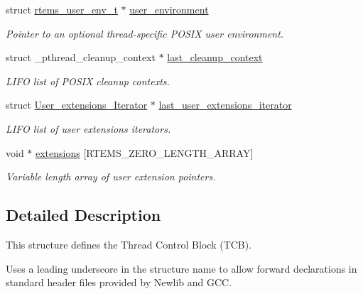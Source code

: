 \begin{DoxyCompactItemize}
struct \mbox{\hyperlink{structrtems__user__env__t}{rtems\+\_\+user\+\_\+env\+\_\+t}} $\ast$ \mbox{\hyperlink{struct__Thread__Control_ae713ecc17e088572e42afdbe076c8149}{user\+\_\+environment}}
\begin{DoxyCompactList}\small\item\em Pointer to an optional thread-\/specific P\+O\+S\+IX user environment. \end{DoxyCompactList}\item 
\mbox{\label{struct__Thread__Control_abce65bc1501abd0a846097b5af9e0604}} 
struct \+\_\+pthread\+\_\+cleanup\+\_\+context $\ast$ \mbox{\hyperlink{struct__Thread__Control_abce65bc1501abd0a846097b5af9e0604}{last\+\_\+cleanup\+\_\+context}}
\begin{DoxyCompactList}\small\item\em L\+I\+FO list of P\+O\+S\+IX cleanup contexts. \end{DoxyCompactList}\item 
\mbox{\label{struct__Thread__Control_a18a1b23d5aaaa58ccbba691990b64feb}} 
struct \mbox{\hyperlink{structUser__extensions__Iterator}{User\+\_\+extensions\+\_\+\+Iterator}} $\ast$ \mbox{\hyperlink{struct__Thread__Control_a18a1b23d5aaaa58ccbba691990b64feb}{last\+\_\+user\+\_\+extensions\+\_\+iterator}}
\begin{DoxyCompactList}\small\item\em L\+I\+FO list of user extensions iterators. \end{DoxyCompactList}\item 
void $\ast$ \mbox{\hyperlink{struct__Thread__Control_ada69103bd5a31290709bde9d9c5aeff8}{extensions}} \mbox{[}R\+T\+E\+M\+S\+\_\+\+Z\+E\+R\+O\+\_\+\+L\+E\+N\+G\+T\+H\+\_\+\+A\+R\+R\+AY\mbox{]}
\begin{DoxyCompactList}\small\item\em Variable length array of user extension pointers. \end{DoxyCompactList}\end{DoxyCompactItemize}


\subsection{Detailed Description}
This structure defines the Thread Control Block (T\+CB).

Uses a leading underscore in the structure name to allow forward declarations in standard header files provided by Newlib and G\+CC.

